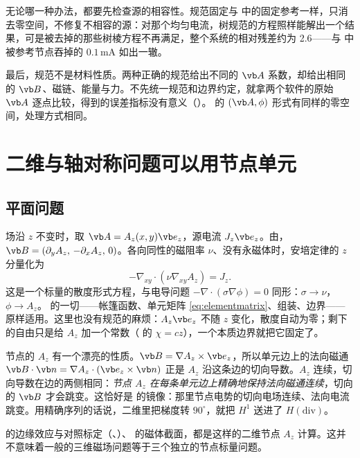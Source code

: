 无论哪一种办法，都要先检查源的相容性。规范固定与 中的固定参考一样，只消去零空间，不修复不相容的源：对那个均匀电流，树规范的方程照样能解出一个结果，可是被去掉的那些树棱方程不再满足，整个系统的相对残差约为 2.6——与 中被参考节点吞掉的 $0.1\,\mathrm{mA}$ 如出一辙。

最后，规范不是材料性质。两种正确的规范给出不同的 $\vb A$ 系数，却给出相同的 $\vb B$、磁链、能量与力。不先统一规范和边界约定，就拿两个软件的原始 $\vb A$ 逐点比较，得到的误差指标没有意义（）。 的 $(\vb A,\phi)$ 形式有同样的零空间，处理方式相同。

\section{二维与轴对称问题可以用节点单元}\label{sec:femvector-2d}

\subsection{平面问题}
场沿 $z$ 不变时，取 $\vb A=A_z(x,y)\vb e_z$，源电流 $J_z\vb e_z$。由，$\vb B=(\partial_yA_z,\,-\partial_xA_z,\,0)$。各向同性的磁阻率 $\nu$、没有永磁体时，安培定律的 $z$ 分量化为
\begin{equation}
-\nabla_{xy}\cdot(\nu\nabla_{xy}A_z)=J_z .
\label{eq:femvector-az}
\end{equation}
这是一个标量的散度形式方程，与电导问题 $-\nabla\cdot(\sigma\nabla\phi)=0$ 同形：$\sigma\to\nu$，$\phi\to A_z$。 的一切——帐篷函数、单元矩阵 \eqref{eq:elementmatrix}、组装、边界——原样适用。这里也没有规范的麻烦：$A_z\vb e_z$ 不随 $z$ 变化，散度自动为零；剩下的自由只是给 $A_z$ 加一个常数（ 的 $\chi=cz$），一个本质边界就把它固定了。

节点的 $A_z$ 有一个漂亮的性质。$\vb B=\nabla A_z\times\vb e_z$，所以单元边上的法向磁通 $\vb B\cdot\vb n=\nabla A_z\cdot(\vb e_z\times\vb n)$ 正是 $A_z$ 沿这条边的切向导数。$A_z$ 连续，切向导数在边的两侧相同：\emph{节点 $A_z$ 在每条单元边上精确地保持法向磁通连续}，切向的 $\vb B$ 才会跳变。这恰好是 的镜像：那里节点电势的切向电场连续、法向电流跳变。用精确序列的话说，二维里把梯度转 $90^\circ$，就把 $H^1$ 送进了 $H(\mathrm{div})$。

 的边缘效应与对照标定（、）、 的磁体截面，都是这样的二维节点 $A_z$ 计算。这并不意味着一般的三维磁场问题等于三个独立的节点标量问题。

